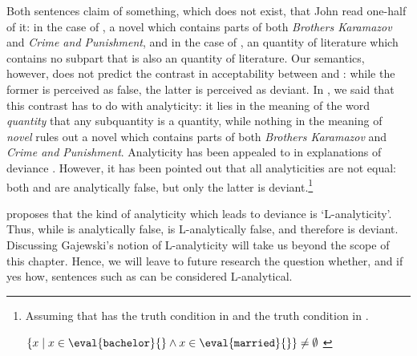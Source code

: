 \documentclass[output=paper]{langscibook}
\begin{document}
\noindent Both sentences claim of something, which does not exist, that John read one-half of it: in the case of , a novel which contains parts of both \textit{ Brothers Karamazov} and \textit{ Crime and Punishment}, and in the case of , an quantity of literature which contains no subpart that is also an quantity of literature. Our semantics, however, does not predict the contrast in acceptability between  and : while the former is perceived as false, the latter is perceived as deviant. In , we said that this contrast has to do with analyticity: it lies in the meaning of the word \textit{quantity} that any subquantity is a quantity, while nothing in the meaning of \textit{novel} rules out a novel which contains parts of both \textit{ Brothers Karamazov} and \textit{ Crime and Punishment}. Analyticity has been appealed to in explanations of deviance \citep[cf.][]{Barwise:1981, vonFintel:1993, krifka1995semantics, abrusan2007contradiction}. However, it has been pointed out that all analyticities are not equal: both  and  are analytically false, but only the latter is deviant.\footnote{Assuming that  has the truth condition in  \citep[cf.][]{heimkratzer1998semantics} and  the truth condition in  \citep[cf.][]{vonFintel:1993}.

\ea
\ea $\{x \mid x \in \eval{\texttt{bachelor}}{} \wedge x \in \eval{\texttt{married}}{}\} \neq \emptyset$
\label{hai-tri:tcbachelors} 
\label{hai-tri:tcexceptive}
\z
\z
} 

\ea 
{}
\label{hai-tri:bachelors}
\label{hai-tri:exceptive} 
\z
\z

\noindent \citet{gajewski2003analyticity} proposes that the kind of analyticity which leads to deviance is `L-analyticity'. Thus, while  is analytically false,  is L-analytically false, and therefore is deviant. Discussing Gajewski's notion of L-analyticity will take us beyond the scope of this chapter. Hence, we will leave to future research the question whether, and if yes how, sentences such as  can be considered L-analytical.%
\end{document}
